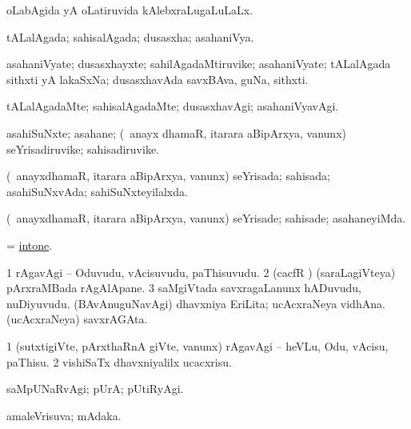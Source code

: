 \bentry
{}
\gl{\gu}
\bmng
oLabAgida yA oLatiruvida kAlebxraLugaLuLaLx. 
\emng
\eentry

\bentry
{}
\gl{\gu}
\bmng
tALalAgada; sahisalAgada; dusasxha; asahaniVya. 
\emng
\eentry

\bentry
{}
\gl{\nA}
\bmng
asahaniVyate; dusasxhayxte; sahilAgadaMtiruvike; asahaniVyate; tALalAgada sithxti yA lakaSxNa; dusasxhavAda savxBAva, guNa, sithxti. 
\emng
\eentry

\bentry
{}
\gl{\kirxvi}
\bmng
tALalAgadaMte; sahisalAgadaMte; dusasxhavAgi; asahaniVyavAgi. 
\emng
\eentry

\bentry
{}
\gl{\nA}
\bmng
asahiSuNxte; asahane; (\kanmu\ anayx dhamaR, itarara aBipArxya, \mo vanunx) seYrisadiruvike; sahisadiruvike. 
\emng
\eentry

\bentry
{}
\gl{\gu}
\bmng
(\kanmu\ anayxdhamaR, itarara aBipArxya, \mo vanunx) seYrisada; sahisada; asahiSuNxvAda; sahiSuNxteyilalxda. 
\emng
\eentry

\bentry
{}
\gl{\kirxvi}
\bmng
(\kanmu\ anayxdhamaR, itarara aBipArxya, \mo vanunx) seYrisade; sahisade; asahaneyiMda. 
\emng
\eentry

\bentry
{}
\gl{\sakirx}
\bmng
=  \hyperlink{intone}{intone}. 
\emng
\eentry

\bentry
{}
\gl{\nA}
\bmng
\bnum
\num{1} rAgavAgi -- Oduvudu, vAcisuvudu, paThisuvudu. 
\num{2} (cacfR \saM) (saraLagiVteya) pArxraMBada rAgAlApane. 
\num{3} saMgiVtada savxragaLanunx hADuvudu, nuDiyuvudu. 
 (BAvAnuguNavAgi) 
\banum
{} dhavxniya EriLita; ucAcxraNeya vidhAna. 
 (ucAcxraNeya) savxrAGAta. 
\eanum
\numie
\enum
\emng
\eentry

\bentry
{}
\gl{\sakirx}
\bmng
\bnum
\num{1} (sutxtigiVte, pArxthaRnA giVte, \mo vanunx) rAgavAgi -- heVLu, Odu, vAcisu, paThisu. 
\num{2} vishiSaTx dhavxniyalilx ucacxrisu. 
\enum
\emng
\eentry

\bentry
{}
\gl{\kirxvi}
\expl{\Latin }
\bmng
saMpUNaRvAgi; pUrA; pUtiRyAgi. 
\emng
\eentry

\bentry
{}
\gl{\gu}
\bmng
amaleVrisuva; mAdaka. 
\emng
\eentry

